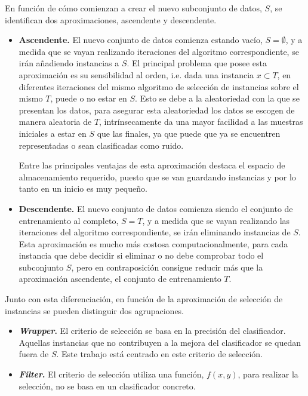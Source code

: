 En función de cómo comienzan a crear el nuevo subconjunto de datos, $S$, se identifican dos aproximaciones, ascendente y descendente.
\begin{itemize}
\item \textbf{Ascendente.} El nuevo conjunto de datos comienza estando vacío, $S = \emptyset$, y a medida que se vayan realizando iteraciones del algoritmo correspondiente, se irán añadiendo instancias a $S$. El principal problema que posee esta aproximación es su sensibilidad al orden, i.e. dada una instancia $x \subset T$, en diferentes iteraciones del mismo algoritmo de selección de instancias sobre el mismo $T$, puede o no estar en $S$. Esto se debe a la aleatoriedad con la que se presentan los datos, para asegurar esta aleatoriedad los datos se escogen de manera aleatoria de $T$, intrínsecamente da una mayor facilidad a las muestras iniciales a estar en $S$ que las finales, ya que puede que ya se encuentren representadas o sean clasificadas como ruido.

Entre las principales ventajas de esta aproximación destaca el espacio de almacenamiento requerido, puesto que se van guardando instancias y por lo tanto en un inicio es muy pequeño.

\item \textbf{Descendente.} El nuevo conjunto de datos comienza siendo el conjunto de entrenamiento al completo, $S = T$, y a medida que se vayan realizando las iteraciones del algoritmo correspondiente, se irán eliminando instancias de $S$. Esta aproximación es mucho más costosa computacionalmente, para cada instancia que debe decidir si eliminar o no debe comprobar todo el subconjunto $S$, pero en contraposición consigue reducir más que la aproximación ascendente, el conjunto de entrenamiento $T$.
\end{itemize}

Junto con esta diferenciación, en función de la aproximación de selección de instancias se pueden distinguir dos agrupaciones.
\begin{itemize}
\item \textbf{\textit{Wrapper}.} El criterio de selección se basa en la precisión del clasificador. Aquellas instancias que no contribuyen a la mejora del clasificador se quedan fuera de $S$. Este trabajo está centrado en este criterio de selección.
\item \textbf{\textit{Filter}.} El criterio de selección utiliza una función, $f(x, y)$, para realizar la selección, no se basa en un clasificador concreto.
\end{itemize}

